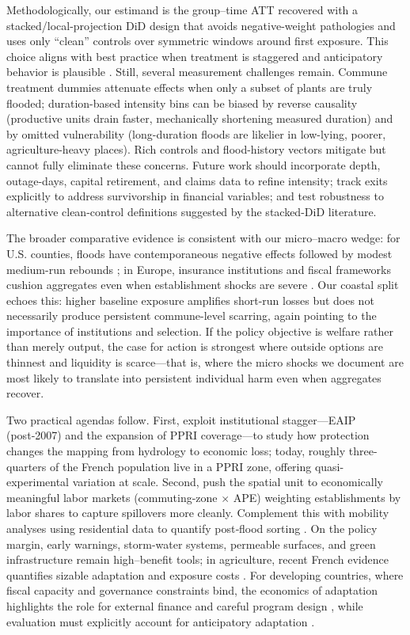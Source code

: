 Methodologically, our estimand is the group–time ATT recovered with a stacked/local-projection DiD design that avoids negative-weight pathologies and uses only ``clean'' controls over symmetric windows around first exposure. This choice aligns with best practice when treatment is staggered and anticipatory behavior is plausible \citep{carleton2024adaptation}. Still, several measurement challenges remain. Commune treatment dummies attenuate effects when only a subset of plants are truly flooded; duration-based intensity bins can be biased by reverse causality (productive units drain faster, mechanically shortening measured duration) and by omitted vulnerability (long-duration floods are likelier in low-lying, poorer, agriculture-heavy places). Rich controls and flood-history vectors mitigate but cannot fully eliminate these concerns. Future work should incorporate depth, outage-days, capital retirement, and claims data to refine intensity; track exits explicitly to address survivorship in financial variables; and test robustness to alternative clean-control definitions suggested by the stacked-DiD literature.

The broader comparative evidence is consistent with our micro–macro wedge: for U.S. counties, floods have contemporaneous negative effects followed by modest medium-run rebounds \citep{roth2020local}; in Europe, insurance institutions and fiscal frameworks cushion aggregates even when establishment shocks are severe \citep{fatica2024floods}. Our coastal split echoes this: higher baseline exposure amplifies short-run losses but does not necessarily produce persistent commune-level scarring, again pointing to the importance of institutions and selection. If the policy objective is welfare rather than merely output, the case for action is strongest where outside options are thinnest and liquidity is scarce—that is, where the micro shocks we document are most likely to translate into persistent individual harm even when aggregates recover.

Two practical agendas follow. First, exploit institutional stagger—EAIP (post‑2007) and the expansion of PPRI coverage—to study how protection changes the mapping from hydrology to economic loss; today, roughly three-quarters of the French population live in a PPRI zone, offering quasi-experimental variation at scale. Second, push the spatial unit to economically meaningful labor markets (commuting-zone $\times$ APE) weighting establishments by labor shares to capture spillovers more cleanly. Complement this with mobility analyses using residential data to quantify post‑flood sorting \citep{lethimillock}. On the policy margin, early warnings, storm-water systems, permeable surfaces, and green infrastructure remain high–benefit tools; in agriculture, recent French evidence quantifies sizable adaptation and exposure costs \citep{du2024costs}. For developing countries, where fiscal capacity and governance constraints bind, the economics of adaptation highlights the role for external finance and careful program design \citep{kala2023climate}, while evaluation must explicitly account for anticipatory adaptation \citep{carleton2024adaptation}.

